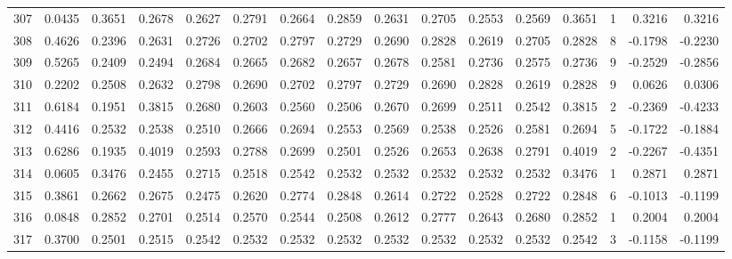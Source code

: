 \begin{tabular}{lrrrrrrrrrrrrrrr}
307 &      0.0435 &  0.3651 &  0.2678 &  0.2627 &  0.2791 &  0.2664 &  0.2859 &  0.2631 &  0.2705 &  0.2553 &   0.2569 &     0.3651 &      1 &                    0.3216 &                     0.3216 \\
308 &      0.4626 &  0.2396 &  0.2631 &  0.2726 &  0.2702 &  0.2797 &  0.2729 &  0.2690 &  0.2828 &  0.2619 &   0.2705 &     0.2828 &      8 &                   -0.1798 &                    -0.2230 \\
309 &      0.5265 &  0.2409 &  0.2494 &  0.2684 &  0.2665 &  0.2682 &  0.2657 &  0.2678 &  0.2581 &  0.2736 &   0.2575 &     0.2736 &      9 &                   -0.2529 &                    -0.2856 \\
310 &      0.2202 &  0.2508 &  0.2632 &  0.2798 &  0.2690 &  0.2702 &  0.2797 &  0.2729 &  0.2690 &  0.2828 &   0.2619 &     0.2828 &      9 &                    0.0626 &                     0.0306 \\
311 &      0.6184 &  0.1951 &  0.3815 &  0.2680 &  0.2603 &  0.2560 &  0.2506 &  0.2670 &  0.2699 &  0.2511 &   0.2542 &     0.3815 &      2 &                   -0.2369 &                    -0.4233 \\
312 &      0.4416 &  0.2532 &  0.2538 &  0.2510 &  0.2666 &  0.2694 &  0.2553 &  0.2569 &  0.2538 &  0.2526 &   0.2581 &     0.2694 &      5 &                   -0.1722 &                    -0.1884 \\
313 &      0.6286 &  0.1935 &  0.4019 &  0.2593 &  0.2788 &  0.2699 &  0.2501 &  0.2526 &  0.2653 &  0.2638 &   0.2791 &     0.4019 &      2 &                   -0.2267 &                    -0.4351 \\
314 &      0.0605 &  0.3476 &  0.2455 &  0.2715 &  0.2518 &  0.2542 &  0.2532 &  0.2532 &  0.2532 &  0.2532 &   0.2532 &     0.3476 &      1 &                    0.2871 &                     0.2871 \\
315 &      0.3861 &  0.2662 &  0.2675 &  0.2475 &  0.2620 &  0.2774 &  0.2848 &  0.2614 &  0.2722 &  0.2528 &   0.2722 &     0.2848 &      6 &                   -0.1013 &                    -0.1199 \\
316 &      0.0848 &  0.2852 &  0.2701 &  0.2514 &  0.2570 &  0.2544 &  0.2508 &  0.2612 &  0.2777 &  0.2643 &   0.2680 &     0.2852 &      1 &                    0.2004 &                     0.2004 \\
317 &      0.3700 &  0.2501 &  0.2515 &  0.2542 &  0.2532 &  0.2532 &  0.2532 &  0.2532 &  0.2532 &  0.2532 &   0.2532 &     0.2542 &      3 &                   -0.1158 &                    -0.1199 \\

\end{tabular}
